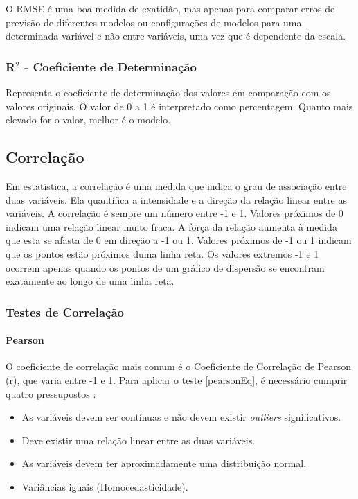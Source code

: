 \documentclass[conference]{IEEEtran}
\begin{document}
O RMSE é uma boa medida de exatidão, mas apenas para comparar erros de previsão de diferentes modelos ou configurações de modelos para uma determinada variável e não entre variáveis, uma vez que é dependente da escala. 

\medskip
\subsubsection{R$^2$ - Coeficiente de Determinação}

Representa o coeficiente de determinação dos valores em comparação com os valores originais. O valor de 0 a 1 é interpretado como percentagem. Quanto mais elevado for o valor, melhor é o modelo.\cite{madureira2024cv} 


\subsection{Correlação}
Em estatística, a correlação é uma medida que indica o grau de associação entre duas variáveis. Ela quantifica a intensidade e a direção da relação linear entre as variáveis.
 A correlação é sempre um número entre -1 e 1. Valores próximos de 0 indicam uma relação linear muito fraca. A força da relação aumenta à medida que esta se afasta de 0 em direção a -1 ou 1. Valores próximos de -1 ou 1 indicam que os pontos estão próximos duma linha reta. Os valores extremos -1 e 1 ocorrem apenas quando os pontos de um gráfico de dispersão se encontram  exatamente ao longo de uma linha reta. \cite{moore2017}

\medskip
\subsubsection{Testes de Correlação}

\paragraph{Pearson}

O coeficiente de correlação mais comum é o Coeficiente de Correlação de Pearson (r), que varia entre -1 e 1. Para aplicar o teste \eqref{pearsonEq}, é necessário cumprir quatro pressupostos \cite{madureira2024}:

\begin{itemize}
	\item As variáveis devem ser contínuas e não devem existir \textit{outliers} significativos.
	\item Deve existir uma relação linear entre as duas variáveis.
	\item As variáveis devem ter aproximadamente uma distribuição normal.
	\item Variâncias iguais (Homocedasticidade).

\end{itemize}
\end{document}
